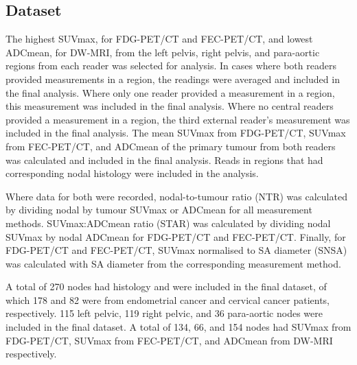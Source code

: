 \documentclass[sn-standardnature]{sn-jnl}
\theoremstyle{thmstyleone}%
\theoremstyle{thmstyletwo}%
\theoremstyle{thmstylethree}%
\begin{document}
    \subsection{Dataset}
    The highest SUVmax, for FDG-PET/CT and FEC-PET/CT, and lowest ADCmean, for DW-MRI, from the left pelvis, right pelvis, and para-aortic regions from each reader was selected for analysis. 
    In cases where both readers provided measurements in a region, the readings were averaged and included in the final analysis. 
    Where only one reader provided a measurement in a region, this measurement was included in the final analysis. 
    Where no central readers provided a measurement in a region, the third external reader's measurement was included in the final analysis.
    The mean SUVmax from FDG-PET/CT, SUVmax from FEC-PET/CT, and ADCmean of the primary tumour from both readers was calculated and included in the final analysis. 
    Reads in regions that had corresponding nodal histology were included in the analysis.

    Where data for both were recorded, nodal-to-tumour ratio (NTR) was calculated by dividing nodal by tumour SUVmax or ADCmean for all measurement methods. SUVmax:ADCmean ratio (STAR) was calculated by dividing nodal SUVmax by nodal ADCmean for FDG-PET/CT and FEC-PET/CT. Finally, for FDG-PET/CT and FEC-PET/CT, SUVmax normalised to SA diameter (SNSA) was calculated with SA diameter from the corresponding measurement method.

    A total of 270 nodes had histology and were included in the final dataset, of which 178 and 82 were from endometrial cancer and cervical cancer patients, respectively. 
    115 left pelvic, 119 right pelvic, and 36 para-aortic nodes were included in the final dataset.
    A total of 134, 66, and 154 nodes had SUVmax from FDG-PET/CT, SUVmax from FEC-PET/CT, and ADCmean from DW-MRI respectively. 
\end{document}
